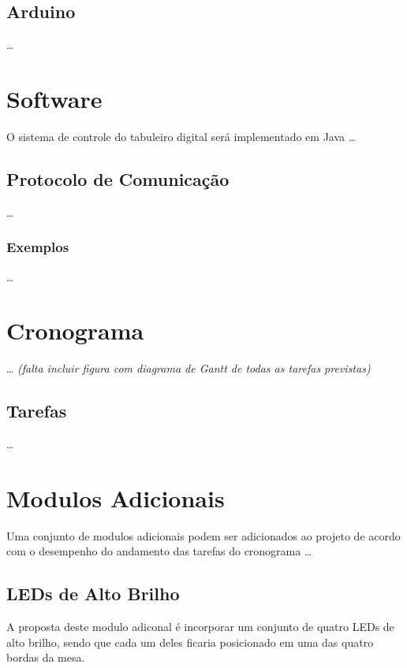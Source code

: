 \documentclass[a4paper,10pt]{article}
\begin{document}
\subsection{Arduino}

\ldots

\section{Software}

O sistema de controle do tabuleiro digital será implementado em Java \ldots

\subsection{Protocolo de Comunicação}

\ldots

\subsubsection{Exemplos}

\ldots

\section{Cronograma}

\ldots
{\it (falta incluir figura com diagrama de Gantt de todas as tarefas previstas)}

\subsection{Tarefas}

\ldots

\section{Modulos Adicionais}

Uma conjunto de modulos adicionais podem ser adicionados ao projeto de acordo com o desempenho do andamento das tarefas do cronograma \ldots

\subsection{LEDs de Alto Brilho}

A proposta deste modulo adiconal é incorporar um conjunto de quatro LEDs de alto brilho, sendo que cada um deles ficaria posicionado em uma das quatro bordas da mesa. \\
\end{document}

